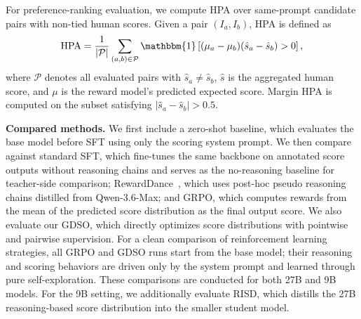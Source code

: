 \documentclass{article}
\newcommand{\teaname}{GDSO\xspace}
\newcommand{\stuname}{RISD\xspace}
\begin{document}
For preference-ranking evaluation, we compute HPA over same-prompt candidate pairs with non-tied human scores. Given a pair $(I_a,I_b)$, HPA is defined as
\begin{equation}
\mathrm{HPA}
=
\frac{1}{|\mathcal{P}|}
\sum_{(a,b)\in\mathcal{P}}
\mathbbm{1}
\left[
(\mu_a-\mu_b)(\hat{s}_a-\hat{s}_b) > 0
\right],
\label{eq:hpa}
\end{equation}
where $\mathcal{P}$ denotes all evaluated pairs with $\hat{s}_a \neq \hat{s}_b$, $\hat{s}$ is the aggregated human score, and $\mu$ is the reward model's predicted expected score. Margin HPA is computed on the subset satisfying $|\hat{s}_a-\hat{s}_b|>0.5$.


\textbf{Compared methods.} We first include a zero-shot baseline, which evaluates the base model before SFT using only the scoring system prompt. We then compare against standard SFT,  which fine-tunes the same backbone on annotated score outputs without reasoning chains and serves as the no-reasoning baseline for teacher-side comparison; RewardDance~\cite{wu2025rewarddancerewardscalingvisual}, which uses post-hoc pseudo reasoning chains distilled from Qwen-3.6-Max; and GRPO, which computes rewards from the mean of the predicted score distribution as the final output score. We also evaluate our \teaname, which directly optimizes score distributions with pointwise and pairwise supervision. For a clean comparison of reinforcement learning strategies, all GRPO and \teaname runs start from the base model; their reasoning and scoring behaviors are driven only by the system prompt and learned through pure self-exploration. These comparisons are conducted for both 27B and 9B models. For the 9B setting, we additionally evaluate \stuname, which distills the 27B reasoning-based score distribution into the smaller student model.
\end{document}
